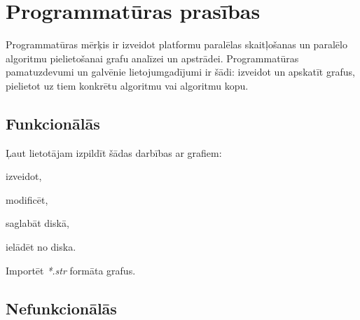 \section{Programmatūras prasības}
Programmatūras mērķis ir izveidot platformu paralēlas skaitļošanas un paralēlo
algoritmu pielietošanai grafu analīzei un apstrādei. Programmatūras pamatuzdevumi
un galvēnie lietojumgadījumi ir šādi: izveidot un apskatīt grafus, pielietot uz
tiem konkrētu algoritmu vai algoritmu kopu.

\subsection{Funkcionālās}
\begin{numlist}
	\item Ļaut lietotājam izpildīt šādas darbības ar grafiem:
	\begin{dotlist}
		\item izveidot,
		\item modificēt,
		\item saglabāt diskā,
		\item ielādēt no diska.
	\end{dotlist}
	\item Importēt \emph{*.str} formāta grafus.
\end{numlist}

\subsection{Nefunkcionālās}

